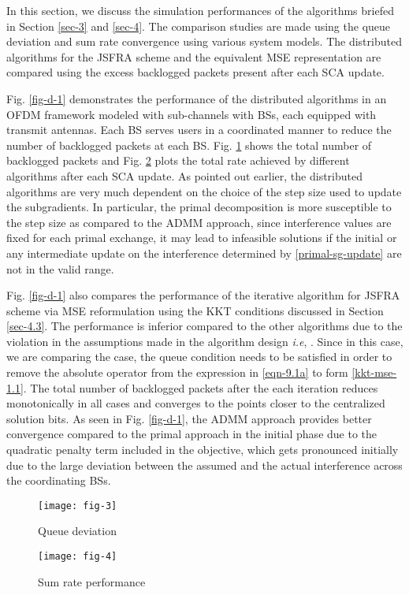 In this section, we discuss the simulation performances of the algorithms briefed in Section \ref{sec-3} and \ref{sec-4}. The comparison studies are made using the queue deviation and sum rate convergence using various system models. The distributed algorithms for the \ac{JSFRA} scheme and the equivalent \ac{MSE} representation are compared using the excess backlogged packets present after each \ac{SCA} update.

Fig. \ref{fig-d-1} demonstrates the performance of the distributed algorithms in an \ac{OFDM} framework modeled with  sub-channels with  \acp{BS}, each equipped with  transmit antennas. Each \ac{BS} serves  users in a coordinated manner to reduce the number of backlogged packets at each \ac{BS}. Fig. \ref{fig-d-1.1} shows the total number of backlogged packets  and Fig. \ref{fig-d-1.2} plots the total rate achieved by different algorithms after each \ac{SCA} update. As pointed out earlier, the distributed algorithms are very much dependent on the choice of the step size used to update the subgradients. In particular, the primal decomposition is more susceptible to the step size as compared to the \ac{ADMM} approach, since interference values are fixed for each primal exchange, it may lead to infeasible solutions if the initial or any intermediate update on the interference determined by \eqref{primal-sg-update} are not in the valid range.

Fig. \ref{fig-d-1} also compares the performance of the iterative algorithm for \ac{JSFRA} scheme via \ac{MSE} reformulation using the \ac{KKT} conditions discussed in Section \ref{sec-4.3}. The performance is inferior compared to the other algorithms due to the violation in the assumptions made in the algorithm design \textit{i.e}, . Since in this case, we are comparing the  case, the queue condition  needs to be satisfied in order to remove the absolute operator from the expression in \eqref{eqn-9.1a} to form \eqref{kkt-mse-1.1}. The total number of backlogged packets after the each iteration reduces monotonically in all cases and converges to the points closer to the centralized solution  bits. As seen in Fig. \ref{fig-d-1}, the \ac{ADMM} approach provides better convergence compared to the primal approach in the initial phase due to the quadratic penalty term included in the objective, which gets pronounced initially due to the large deviation between the assumed and the actual interference across the coordinating \acp{BS}.
\begin{figure*}
\centering
\begin{subfigure}{0.49\textwidth}
\texttt{[image: fig-3]}
\caption{Queue deviation}
\label{fig-d-1.1}
\end{subfigure}
\hfill
\begin{subfigure}{0.49\textwidth}
\texttt{[image: fig-4]}
\caption{Sum rate performance}
\label{fig-d-1.2}
\end{subfigure}
\caption[short]{Convergence plot for  model}
\label{fig-d-1}
\end{figure*}

